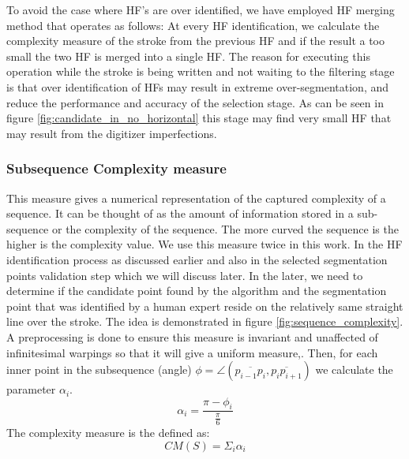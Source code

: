 \documentclass[journal,compsoc]{IEEEtran}
\begin{document}
To avoid the case where HF's are over identified, we have employed HF merging method that operates as follows: At every HF identification, we calculate the complexity measure of the stroke from the previous HF and if the result a too small the two HF is merged into a single HF.
The reason for executing this operation while the stroke is being written and not waiting to the filtering stage is that over identification of HFs may result in extreme over-segmentation, and reduce the performance and accuracy of the selection stage. As can be seen in figure \ref{fig:candidate_in_no_horizontal} this stage may find very small HF that may result from the digitizer imperfections. 

\subsubsection{Subsequence Complexity measure }
\label{subsec:scm}
This measure gives a numerical representation of the captured complexity of a sequence. It can be thought of as the amount of information stored in a sub-sequence or the complexity of the sequence. The more curved the sequence is the higher is the complexity value. We use this measure twice in this work. In the HF identification process as discussed earlier and also in the selected segmentation points validation step which we will discuss later. In the later, we need to determine if the candidate point found by the algorithm and the segmentation point that was identified by a human expert reside on the relatively same straight line over the stroke. The idea is demonstrated in figure \ref{fig:sequence_complexity}.
A preprocessing is done to ensure this measure is invariant and unaffected of infinitesimal warpings so that it will give a uniform measure,. 
Then, for each inner point in the subsequence (angle) $\phi=\angle(\overline{p_{i-1}p_{i}},\overline{p_{i}p_{i+1}})$ we calculate the parameter $\alpha_{i}$.
\begin{equation}
 \alpha_{i}=\frac{\pi-\phi_{i}}{\frac{\pi}{6}}
\end{equation}
The complexity measure is the defined as:
\begin{equation}
CM(S)=\Sigma_{i}\alpha_{i}
\end{equation}
\end{document}
